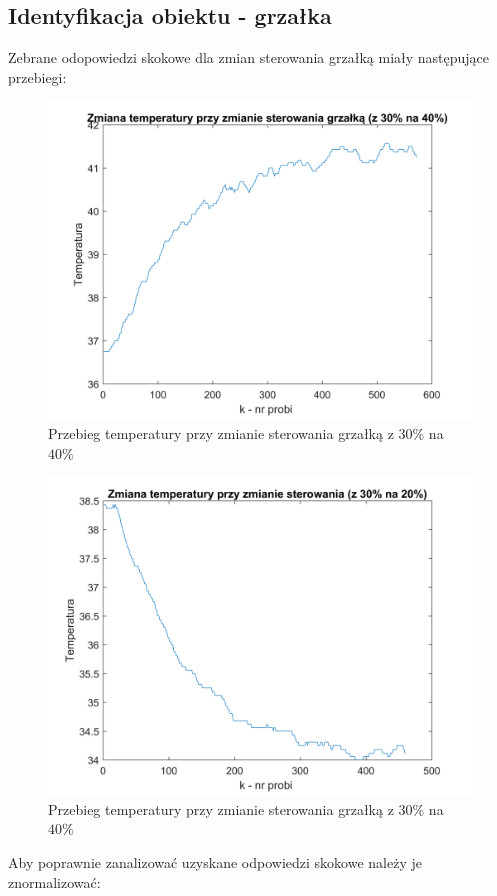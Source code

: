 \documentclass[12pt, a4paper]{article}
\begin{document}
\subsection{Identyfikacja obiektu - grzałka} \label{grzalka}
Zebrane odopowiedzi skokowe dla zmian sterowania grzałką miały następujące przebiegi:
\begin{figure}[H]
	\centering
	\includegraphics[width=0.9\linewidth]{nnor_od_skok_gg}
	\caption{Przebieg temperatury przy zmianie sterowania grzałką z $30\%$ na $40\%$}
	\label{fig:nnosgg}
\end{figure}
\begin{figure}[H]
	\centering
	\includegraphics[width=0.9\linewidth]{nnor_od_skok_gd}
	\caption{Przebieg temperatury przy zmianie sterowania grzałką z $30\%$ na $40\%$}
	\label{fig:nnosgd}
\end{figure}
Aby poprawnie zanalizować uzyskane odpowiedzi skokowe należy je znormalizować: \\
\end{document}
